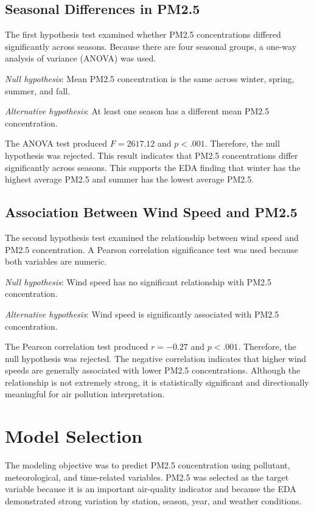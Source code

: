\documentclass[stu,12pt,floatsintext]{apa7}
\begin{document}
\subsection{Seasonal Differences in PM2.5}

The first hypothesis test examined whether PM2.5 concentrations differed significantly
across seasons. Because there are four seasonal groups, a one-way analysis of variance
(ANOVA) was used.

\textit{Null hypothesis}: Mean PM2.5 concentration is the same across winter, spring,
summer, and fall.

\textit{Alternative hypothesis}: At least one season has a different mean PM2.5
concentration.

The ANOVA test produced $F = 2617.12$ and $p < .001$. Therefore, the null hypothesis
was rejected. This result indicates that PM2.5 concentrations differ significantly across
seasons. This supports the EDA finding that winter has the highest average PM2.5 and
summer has the lowest average PM2.5.

\subsection{Association Between Wind Speed and PM2.5}

The second hypothesis test examined the relationship between wind speed and PM2.5
concentration. A Pearson correlation significance test was used because both variables
are numeric.

\textit{Null hypothesis}: Wind speed has no significant relationship with PM2.5
concentration.

\textit{Alternative hypothesis}: Wind speed is significantly associated with PM2.5
concentration.

The Pearson correlation test produced $r = -0.27$ and $p < .001$. Therefore, the null
hypothesis was rejected. The negative correlation indicates that higher wind speeds are
generally associated with lower PM2.5 concentrations. Although the relationship is not
extremely strong, it is statistically significant and directionally meaningful for air
pollution interpretation.

\section{Model Selection}

The modeling objective was to predict PM2.5 concentration
using pollutant, meteorological, and time-related variables. PM2.5 was selected as the
target variable because it is an important air-quality indicator and because the EDA
demonstrated strong variation by station, season, year, and weather conditions.
\end{document}

